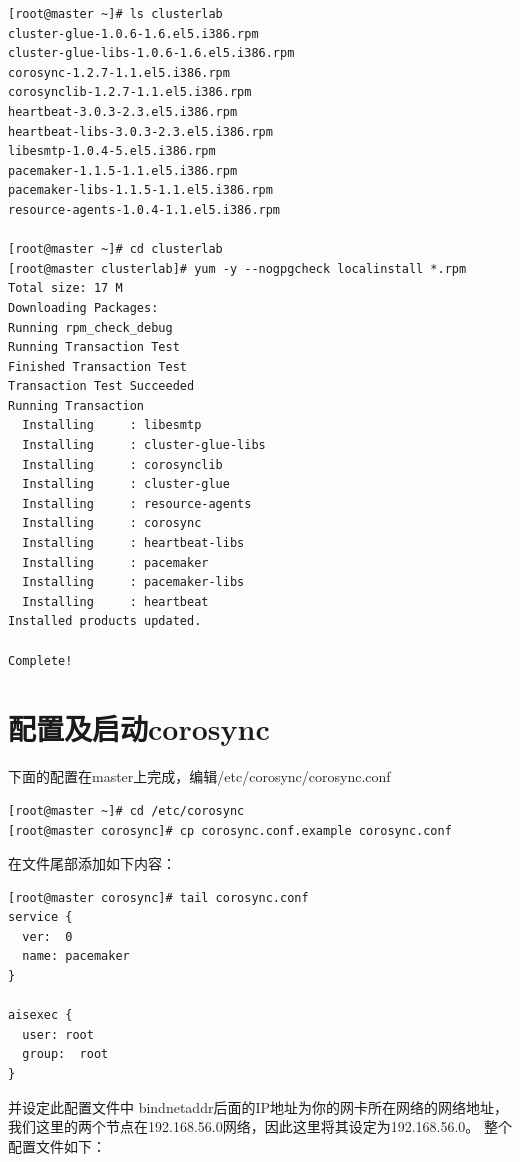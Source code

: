 \begin{verbatim}
[root@master ~]# ls clusterlab
cluster-glue-1.0.6-1.6.el5.i386.rpm       
cluster-glue-libs-1.0.6-1.6.el5.i386.rpm  
corosync-1.2.7-1.1.el5.i386.rpm           
corosynclib-1.2.7-1.1.el5.i386.rpm        
heartbeat-3.0.3-2.3.el5.i386.rpm          
heartbeat-libs-3.0.3-2.3.el5.i386.rpm
libesmtp-1.0.4-5.el5.i386.rpm
pacemaker-1.1.5-1.1.el5.i386.rpm
pacemaker-libs-1.1.5-1.1.el5.i386.rpm
resource-agents-1.0.4-1.1.el5.i386.rpm

[root@master ~]# cd clusterlab
[root@master clusterlab]# yum -y --nogpgcheck localinstall *.rpm
Total size: 17 M
Downloading Packages:
Running rpm_check_debug
Running Transaction Test
Finished Transaction Test
Transaction Test Succeeded
Running Transaction
  Installing     : libesmtp
  Installing     : cluster-glue-libs
  Installing     : corosynclib
  Installing     : cluster-glue
  Installing     : resource-agents 
  Installing     : corosync
  Installing     : heartbeat-libs
  Installing     : pacemaker
  Installing     : pacemaker-libs 
  Installing     : heartbeat
Installed products updated.

Complete!
\end{verbatim}

\section{配置及启动corosync}

下面的配置在master上完成，编辑/etc/corosync/corosync.conf

\begin{verbatim}
[root@master ~]# cd /etc/corosync
[root@master corosync]# cp corosync.conf.example corosync.conf
\end{verbatim}

在文件尾部添加如下内容：

\begin{verbatim}
[root@master corosync]# tail corosync.conf
service {
  ver:  0
  name: pacemaker
}

aisexec {
  user: root
  group:  root
}
\end{verbatim}

并设定此配置文件中 bindnetaddr后面的IP地址为你的网卡所在网络的网络地址，
我们这里的两个节点在192.168.56.0网络，因此这里将其设定为192.168.56.0。
整个配置文件如下：


